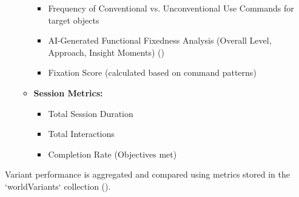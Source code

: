 \documentclass{article}
\begin{document}
\begin{itemize}
\begin{itemize}
\begin{itemize}
                    \item Frequency of Conventional vs. Unconventional Use Commands for target objects
                    \item AI-Generated Functional Fixedness Analysis (Overall Level, Approach, Insight Moments) ()
                    \item Fixation Score (calculated based on command patterns)
                \end{itemize}
            \item \textbf{Session Metrics:}
                \begin{itemize}
                    \item Total Session Duration
                    \item Total Interactions
                    \item Completion Rate (Objectives met)
                \end{itemize}
        \end{itemize}
\end{itemize}
Variant performance is aggregated and compared using metrics stored in the `worldVariants` collection ().
\end{document}
